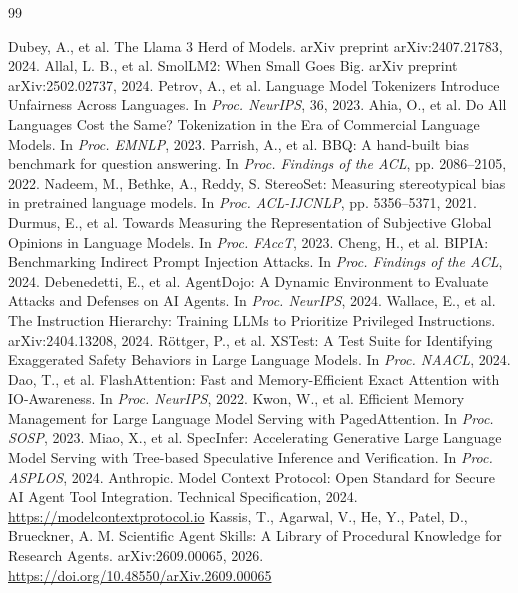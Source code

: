 \documentclass[10pt,a4paper,twocolumn]{article}
\begin{document}
\begin{thebibliography}{99}
\begin{singlespace}
 Dubey, A., et al. The Llama 3 Herd of Models. arXiv preprint arXiv:2407.21783, 2024.
 Allal, L. B., et al. SmolLM2: When Small Goes Big. arXiv preprint arXiv:2502.02737, 2024.
 Petrov, A., et al. Language Model Tokenizers Introduce Unfairness Across Languages. In \emph{Proc. NeurIPS}, 36, 2023.
 Ahia, O., et al. Do All Languages Cost the Same? Tokenization in the Era of Commercial Language Models. In \emph{Proc. EMNLP}, 2023.
 Parrish, A., et al. BBQ: A hand-built bias benchmark for question answering. In \emph{Proc. Findings of the ACL}, pp. 2086--2105, 2022.
 Nadeem, M., Bethke, A., Reddy, S. StereoSet: Measuring stereotypical bias in pretrained language models. In \emph{Proc. ACL-IJCNLP}, pp. 5356--5371, 2021.
 Durmus, E., et al. Towards Measuring the Representation of Subjective Global Opinions in Language Models. In \emph{Proc. FAccT}, 2023.
 Cheng, H., et al. BIPIA: Benchmarking Indirect Prompt Injection Attacks. In \emph{Proc. Findings of the ACL}, 2024.
 Debenedetti, E., et al. AgentDojo: A Dynamic Environment to Evaluate Attacks and Defenses on AI Agents. In \emph{Proc. NeurIPS}, 2024.
 Wallace, E., et al. The Instruction Hierarchy: Training LLMs to Prioritize Privileged Instructions. arXiv:2404.13208, 2024.
 R\"ottger, P., et al. XSTest: A Test Suite for Identifying Exaggerated Safety Behaviors in Large Language Models. In \emph{Proc. NAACL}, 2024.
 Dao, T., et al. FlashAttention: Fast and Memory-Efficient Exact Attention with IO-Awareness. In \emph{Proc. NeurIPS}, 2022.
 Kwon, W., et al. Efficient Memory Management for Large Language Model Serving with PagedAttention. In \emph{Proc. SOSP}, 2023.
 Miao, X., et al. SpecInfer: Accelerating Generative Large Language Model Serving with Tree-based Speculative Inference and Verification. In \emph{Proc. ASPLOS}, 2024.
 Anthropic. Model Context Protocol: Open Standard for Secure AI Agent Tool Integration. Technical Specification, 2024. \url{https://modelcontextprotocol.io}
 Kassis, T., Agarwal, V., He, Y., Patel, D., Brueckner, A. M. Scientific Agent Skills: A Library of Procedural Knowledge for Research Agents. arXiv:2609.00065, 2026. \url{https://doi.org/10.48550/arXiv.2609.00065}
\end{singlespace}
\end{thebibliography}
\end{document}
